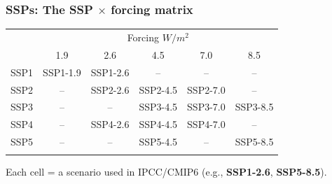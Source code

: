 \documentclass[xcolor=x11names,compress,aspectratio=169]{beamer}%
\begin{document}
\begin{frame}%
%

\frametitle{SSPs: The SSP $\times$ forcing matrix }%


\centering
\begin{tabular}
[c]{lccccc}%
\toprule & \multicolumn{5}{c}{Forcing $W/m^{2}$}\\
&
\textcolor{forc19}{1.9}%
&
\textcolor{forc26}{2.6}%
&
\textcolor{forc45}{4.5}%
&
\textcolor{forc70}{7.0}%
&
\textcolor{forc85}{8.5}%
\\
\midrule\textcolor{ssp1}{SSP1} & SSP1-1.9 & SSP1-2.6 & -- & -- & --\\
\textcolor{ssp2}{SSP2} & -- & SSP2-2.6 & SSP2-4.5 & SSP2-7.0 & --\\
\textcolor{ssp3}{SSP3} & -- & -- & SSP3-4.5 & SSP3-7.0 & SSP3-8.5\\
\textcolor{ssp4}{SSP4} & -- & SSP4-2.6 & SSP4-4.5 & SSP4-7.0 & --\\
\textcolor{ssp5}{SSP5} & -- & -- & SSP5-4.5 & -- & SSP5-8.5\\
\bottomrule &  &  &  &  &
\end{tabular}


\vspace{0.5em} {\footnotesize Each cell = a scenario used in IPCC/CMIP6 (e.g.,
\textcolor{ssp1}{\textbf{SSP1-2.6}}, \textcolor{ssp5}{\textbf{SSP5-8.5}}).}%

\transboxout
\end{frame}%
%
\end{document}
